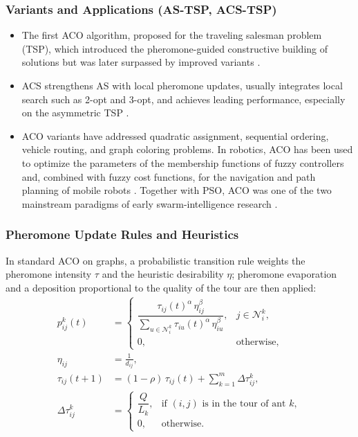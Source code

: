 \subsubsection{Variants and Applications (AS-TSP, ACS-TSP)}

\begin{itemize}
  \item {} The first ACO algorithm, proposed for the
        traveling salesman problem (TSP), which introduced the pheromone-guided
        constructive building of solutions but was later surpassed by improved
        variants \cite{dorigo1996ant}.
  \item {} ACS strengthens AS with local pheromone
        updates, usually integrates local search such as 2-opt and 3-opt, and
        achieves leading performance, especially on the asymmetric TSP
        \cite{dorigo1997ant,bonabeau1999swarm}.
  \item {} ACO variants have addressed quadratic
        assignment, sequential ordering, vehicle routing, and graph coloring
        problems. In robotics, ACO has been used to optimize the parameters of
        the membership functions of fuzzy controllers and, combined with fuzzy
        cost functions, for the navigation and path planning of mobile robots
        \cite{panigrahi2011handbook}. Together with PSO, ACO was one of the two
        mainstream paradigms of early swarm-intelligence research
        \cite{seebacher2025collective}.
\end{itemize}

\subsubsection{Pheromone Update Rules and Heuristics}

In standard ACO on graphs, a probabilistic transition rule weights the pheromone
intensity $\tau$ and the heuristic desirability $\eta$; pheromone evaporation and
a deposition proportional to the quality of the tour are then applied:
\begin{align}
  p_{ij}^{k}(t) &=
    \begin{cases}
      \dfrac{\tau_{ij}(t)^{\alpha}\,\eta_{ij}^{\beta}}
            {\sum_{u \in \mathcal{N}_i^{k}} \tau_{iu}(t)^{\alpha}\,\eta_{iu}^{\beta}},
        & j \in \mathcal{N}_i^{k}, \\[2ex]
      0, & \text{otherwise},
    \end{cases}
    \label{eq:aco-transition} \\[1ex]
  \eta_{ij} &= \frac{1}{d_{ij}},
    \label{eq:aco-heuristic} \\[1ex]
  \tau_{ij}(t+1) &= (1-\rho)\,\tau_{ij}(t) + \sum_{k=1}^{m} \Delta\tau_{ij}^{k},
    \label{eq:aco-update} \\[1ex]
  \Delta\tau_{ij}^{k} &=
    \begin{cases}
      \dfrac{Q}{L_k}, & \text{if } (i,j) \text{ is in the tour of ant } k, \\[1.5ex]
      0, & \text{otherwise}.
    \end{cases}
    \label{eq:aco-deposit}
\end{align}

